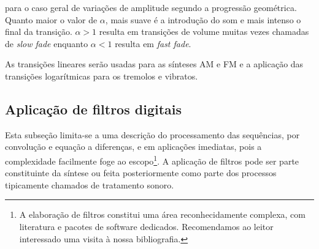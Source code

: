 para o caso geral de variações de amplitude segundo a progressão geométrica. Quanto maior o valor de $\alpha$, mais suave é a introdução do som e mais intenso o final da transição. $\alpha>1$ resulta em transições de volume muitas vezes chamadas de \emph{slow fade} enquanto $\alpha<1$ resulta em \emph{fast fade}.\cite{fades}

As transições lineares serão usadas para
as sínteses AM e FM e a aplicação das transições
logarítmicas para os tremolos e vibratos.

\subsection{Aplicação de filtros digitais}
Esta subseção limita-se a uma descrição
do processamento das sequências, por convolução
e equação a diferenças, e em aplicações
imediatas, pois a complexidade facilmente
foge ao escopo\footnote{A elaboração de filtros
constitui uma área reconhecidamente complexa, com literatura
e pacotes de software dedicados. 
Recomendamos ao leitor
interessado uma visita à nossa bibliografia.\cite{Openheim,smith}}. A aplicação de filtros pode
ser parte constituinte da síntese ou feita posteriormente
como parte dos processos tipicamente chamados de tratamento sonoro.

